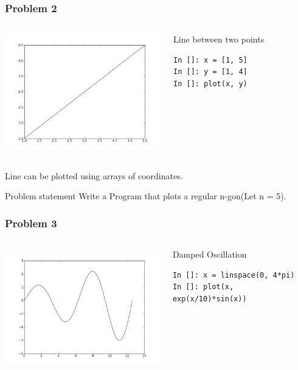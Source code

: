 \documentclass[14pt,compress]{beamer}
\begin{document}
\begin{frame}[fragile]
  \frametitle{Problem 2}
  \begin{columns}
    \hspace*{-0.5in}
    \includegraphics[height=2in, interpolate=true]{data/points}
    \begin{block}{Line between two points}
    \tiny
    \begin{lstlisting}
In []: x = [1, 5]
In []: y = [1, 4]
In []: plot(x, y)
    \end{lstlisting}
    \end{block}
  \end{columns}
  Line can be plotted using arrays of coordinates.
  \pause
  \begin{block}{Problem statement}
    Write a Program that plots a regular n-gon(Let n = 5).
  \end{block}  
\end{frame}


\begin{frame}[fragile]
  \frametitle{Problem 3}
  \begin{columns}
    \hspace*{-0.5in}
    \includegraphics[height=2in, interpolate=true]{data/damp}
    \begin{block}{Damped Oscillation}
    \tiny
    \begin{lstlisting}
In []: x = linspace(0, 4*pi)
In []: plot(x, exp(x/10)*sin(x))
    \end{lstlisting}
    \end{block}
  \end{columns}
\end{frame}
\end{document}
